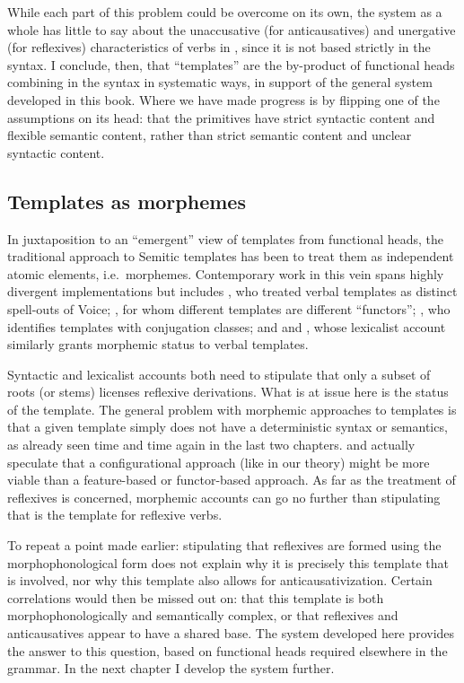 {While each part of this problem could be overcome on its own, the system as a whole has little to say about the unaccusative (for anticausatives) and unergative (for reflexives) characteristics of verbs in {\thit}, since it is not based strictly in the syntax. I conclude, then, that ``templates'' are the by-product of functional heads combining in the syntax in systematic ways, in support of the general system developed in this book. Where we have made progress is by flipping one of the assumptions on its head: that the primitives have strict syntactic content and flexible semantic content, rather than strict semantic content and unclear syntactic content.

	\subsection{Templates as morphemes} \label{vz:others:morph}
In juxtaposition to an ``emergent'' view of templates from functional heads, the traditional approach to Semitic templates has been to treat them as independent atomic elements, i.e.~morphemes. Contemporary work in this vein spans highly divergent implementations but includes \cite{arad03,arad05}, who treated verbal templates as distinct spell-outs of Voice; \cite{borer13oup}, for whom different templates are different ``functors''; \cite{aronoff94,aronoff07}, who identifies templates with conjugation classes; and \cite{reinhartsiloni05} and \cite{laks11,laks14}, whose lexicalist account similarly grants morphemic status to verbal templates.

Syntactic and lexicalist accounts both need to stipulate that only a subset of roots (or stems) licenses reflexive derivations. What is at issue here is the status of the template. The general problem with morphemic approaches to templates is that a given template simply does not have a deterministic syntax or semantics, as already seen time and time again in the last two chapters. \citet[198]{arad05} and \citet[564]{borer13oup} actually speculate that a configurational approach (like in our theory) might be more viable than a feature-based or functor-based approach. As far as the treatment of reflexives is concerned, morphemic accounts can go no further than stipulating that {\thit} is the template for reflexive verbs.

To repeat a point made earlier: stipulating that reflexives are formed using the morphophonological form {\thit} does not explain why it is precisely this template that is involved, nor why this template also allows for anticausativization. Certain correlations would then be missed out on: that this template is both morphophonologically and semantically complex, or that reflexives and anticausatives appear to have a shared base. The system developed here provides the answer to this question, based on functional heads required elsewhere in the grammar. In the next chapter I develop the system further.



}

